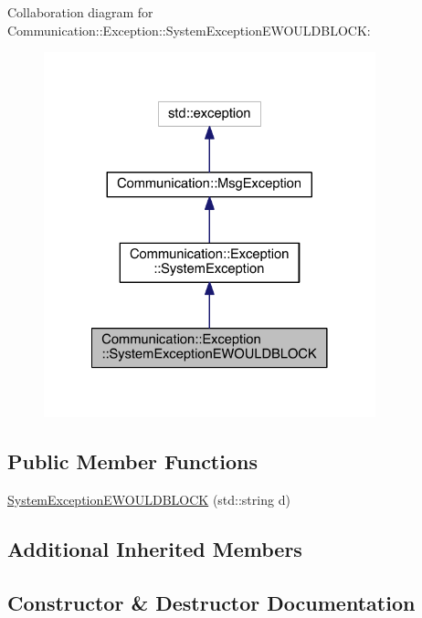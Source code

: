 Collaboration diagram for Communication\+:\+:Exception\+:\+:System\+Exception\+E\+W\+O\+U\+L\+D\+B\+L\+O\+C\+K\+:\nopagebreak
\begin{figure}[H]
\begin{center}
\leavevmode
\includegraphics[width=272pt]{class_communication_1_1_exception_1_1_system_exception_e_w_o_u_l_d_b_l_o_c_k__coll__graph}
\end{center}
\end{figure}
\subsection*{Public Member Functions}
\begin{DoxyCompactItemize}
\item 
\hyperlink{class_communication_1_1_exception_1_1_system_exception_e_w_o_u_l_d_b_l_o_c_k_a105ce3d55285754724e37b61b6cec20b}{System\+Exception\+E\+W\+O\+U\+L\+D\+B\+L\+O\+C\+K} (std\+::string d)
\end{DoxyCompactItemize}
\subsection*{Additional Inherited Members}


\subsection{Constructor \& Destructor Documentation}
\hypertarget{class_communication_1_1_exception_1_1_system_exception_e_w_o_u_l_d_b_l_o_c_k_a105ce3d55285754724e37b61b6cec20b}{}
